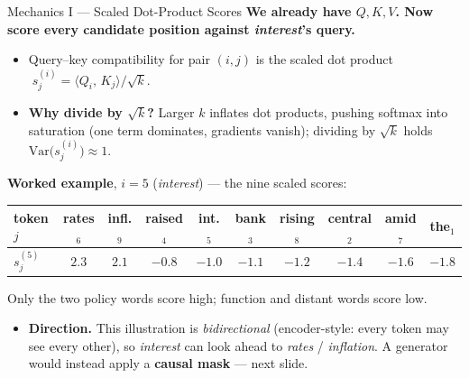 \begin{frame}{Mechanics I --- Scaled Dot-Product Scores}
\textbf{We already have $Q, K, V$. Now score every candidate position against \emph{interest}'s query.}
\begin{itemize}
\item Query--key compatibility for pair $(i,j)$ is the scaled dot product $\;s_{j}^{(i)} = \langle Q_{i},\, K_{j}\rangle / \sqrt{k}$.
\item \textbf{Why divide by $\sqrt{k}$?} Larger $k$ inflates dot products, pushing softmax into saturation (one term dominates, gradients vanish); dividing by $\sqrt{k}$ holds $\mathrm{Var}\bigl(s_j^{(i)}\bigr)\approx 1$.
\end{itemize}

\smallskip
\textbf{Worked example}, $i=5$ (\emph{interest}) --- the nine scaled scores:
\begin{center}\footnotesize
\renewcommand{\arraystretch}{1.15}
\begin{tabular}{l|ccccccccc}
\toprule
token $j$ & rates$_6$ & infl.$_9$ & raised$_4$ & int.$_5$ & bank$_3$ & rising$_8$ & central$_2$ & amid$_7$ & the$_1$\\
\midrule
$s_j^{(5)}$ & $2.3$ & $2.1$ & $-0.8$ & $-1.0$ & $-1.1$ & $-1.2$ & $-1.4$ & $-1.6$ & $-1.8$\\
\bottomrule
\end{tabular}
\end{center}
Only the two policy words score high; function and distant words score low.

\smallskip
\begin{itemize}
\item \textbf{Direction.} This illustration is \emph{bidirectional} (encoder-style: every token may see every other), so \emph{interest} can look ahead to \emph{rates} / \emph{inflation}. A generator would instead apply a \textbf{causal mask} --- next slide.
\end{itemize}
\end{frame}

